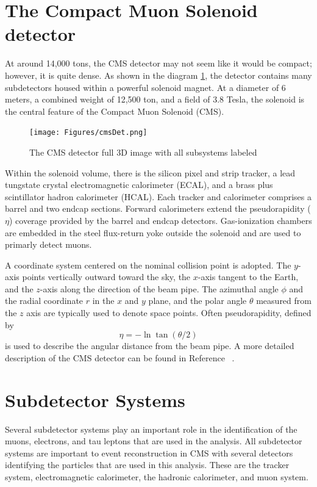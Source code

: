 \section{The Compact Muon Solenoid detector}
At around 14,000 tons, the CMS detector may not seem like it would be compact; however, it is quite dense. 
As shown in the diagram \ref{fig:cmsdet}, the detector contains many subdetectors housed within a powerful solenoid magnet. At a diameter of 6 meters, a combined weight of 12,500 ton, and a field of 3.8 Tesla, the solenoid is the central feature of the Compact Muon Solenoid (CMS).
\begin{figure}[!htb]
\begin{center}
\texttt{[image: Figures/cmsDet.png]}
\caption{\label{fig:cmsdet}The CMS detector full 3D image with all subsystems labeled}
\end{center}
\end{figure}
 Within the solenoid volume, there is the
silicon pixel and strip tracker, a lead tungstate crystal 
electromagnetic calorimeter (ECAL), and a brass plus scintillator 
hadron calorimeter (HCAL). Each tracker and calorimeter comprises a barrel and two endcap 
sections. Forward calorimeters extend the pseudorapidity ($\eta$)
coverage provided by the barrel and endcap detectors. 
Gas-ionization chambers are embedded 
in the steel flux-return yoke outside the solenoid and are used to primarly detect muons.

A coordinate system centered on the nominal collision point is adopted. 
The $y$-axis points vertically outward toward the sky, the $x$-axis tangent to the Earth, and the $z$-axis along the direction of the beam pipe. The azimuthal angle $\phi$ and the radial coordinate $r$ in the $x$ and $y$ plane, and the polar angle $\theta$ measured from the $z$ axis are typically used to denote space points. 
Often pseudorapidity, defined by
\begin{equation}\eta = - \ln \tan(\theta/2)\end{equation}  
 is used to describe the angular distance from the beam pipe. A more detailed description of the CMS detector can be found in Reference ~\cite{Chatrchyan:2008zzk}.



\section{Subdetector Systems}
Several subdetector systems play an important role in the identification of the muons, electrons, and tau leptons that are used in the analysis. 
All subdetector systems are important to event reconstruction in CMS with several detectors identifying the particles that are used in this analysis. These are the tracker system, electromagnetic calorimeter, the hadronic calorimeter, and muon system. 


